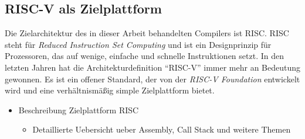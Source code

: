 \subsection{RISC-V als Zielplattform}

Die Zielarchitektur des in dieser Arbeit behandelten Compilers ist RISC.
RISC steht für \textit{Reduced Instruction Set Computing} und ist ein Designprinzip für Prozessoren, das auf wenige, einfache und schnelle Instruktionen setzt.
In den letzten Jahren hat die Architekturdefinition ``RISC-V'' immer mehr an Bedeutung gewonnen.
Es ist ein offener Standard, der von der \textit{RISC-V Foundation} entwickelt wird und eine verhältnismäßig simple Zielplattform bietet.



\begin{itemize}
  \item Beschreibung Zielplattform RISC
  \begin{itemize}
    \item Detaillierte Uebersicht ueber Assembly, Call Stack und weitere Themen
  \end{itemize}
\end{itemize}
